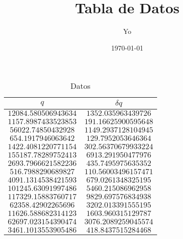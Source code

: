 \documentclass[11pt, spanish, letterpage]{article}
\title{Tabla de Datos}
\author{Yo}\date{\today}
\begin{document}
 
\maketitle 
\begin{table}[H] 
\centering 
\begin{tabular}{||c|c||} 
\hline 
\hline 
$q$ & $\delta q$ \\ 
\hline 
\hline 
$12084.580506943634$ & $1352.035963439726$ \\ 
$1157.8987433523853$ & $191.16625900595648$ \\ 
$56022.74850432928$ & $1149.2937128104945$ \\ 
$654.1917946063642$ & $129.7952053646364$ \\ 
$1422.4081220771154$ & $302.56370679933224$ \\ 
$155187.78289752413$ & $6913.291950477976$ \\ 
$2693.7966621582236$ & $435.7495975635352$ \\ 
$516.7988290689827$ & $110.56003496157471$ \\ 
$4091.1314538421593$ & $679.0261348325195$ \\ 
$101245.63091997486$ & $5460.215086962958$ \\ 
$117329.15883760717$ & $9829.697576834938$ \\ 
$62358.42902265696$ & $3202.013391555195$ \\ 
$11626.588682314123$ & $1603.960315129787$ \\ 
$62697.023154390474$ & $3076.2089259045574$ \\ 
$3461.1013553905486$ & $418.8437515284468$ \\ 
\hline 
\hline 
\end{tabular} 
\caption{Datos} 
\end{table} 
\end{document}
